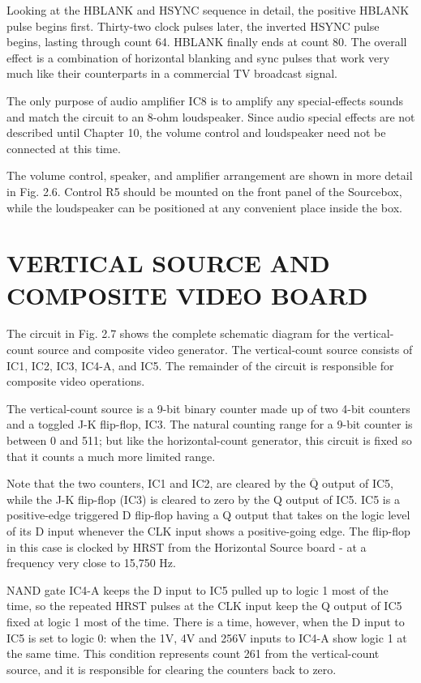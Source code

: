 \documentclass[11pt]{book}              %
\newcommand{\NOT}[1]{$\overline{\mbox{#1}}$}
\begin{document}
Looking at the HBLANK and HSYNC sequence in detail, the positive HBLANK pulse begins first. Thirty-two clock pulses later, the inverted HSYNC pulse begins, lasting through count 64. HBLANK finally ends at count 80. The overall effect is a combination of horizontal blanking and sync pulses that work very much like their counterparts in a commercial TV broadcast signal.

The only purpose of audio amplifier IC8 is to amplify any special-effects sounds and match the circuit to an 8-ohm loudspeaker. Since audio special effects are not described until Chapter 10, the volume control and loudspeaker need not be connected at this time.


The volume control, speaker, and amplifier arrangement are shown in more detail in Fig. 2.6. Control R5 should be mounted on the front panel of the Sourcebox, while the loudspeaker can be positioned at any convenient place inside the box.

\section{VERTICAL SOURCE AND COMPOSITE VIDEO BOARD}

The circuit in Fig. 2.7 shows the complete schematic diagram for the vertical-count source and composite video generator. The vertical-count source consists of IC1, IC2, IC3, IC4-A, and IC5. The remainder of the circuit is responsible for composite video operations.

The vertical-count source is a 9-bit binary counter made up of two 4-bit counters and a toggled J-K flip-flop, IC3. The natural counting range for a 9-bit counter is between 0 and 511; but like the horizontal-count generator, this circuit is fixed so that it counts a much more limited range.

Note that the two counters, IC1 and IC2, are cleared by the \NOT{Q} output of IC5, while the J-K flip-flop (IC3) is cleared to zero by the Q output of IC5. IC5 is a positive-edge triggered D flip-flop having a Q output that takes on the logic level of its D input whenever the CLK input shows a positive-going edge. The flip-flop in this case is clocked by HRST from the Horizontal Source board - at a frequency very close to 15,750 Hz.

NAND gate IC4-A keeps the D input to IC5 pulled up to logic 1 most of the time, so the repeated HRST pulses at the CLK input keep the Q output of IC5 fixed at logic 1 most of the time. There is a time, however, when the D input to IC5 is set to logic 0: when the 1V, 4V and 256V inputs to IC4-A show logic 1 at the same time. This condition represents count 261 from the vertical-count source, and it is responsible for clearing the counters back to zero.
\end{document}
